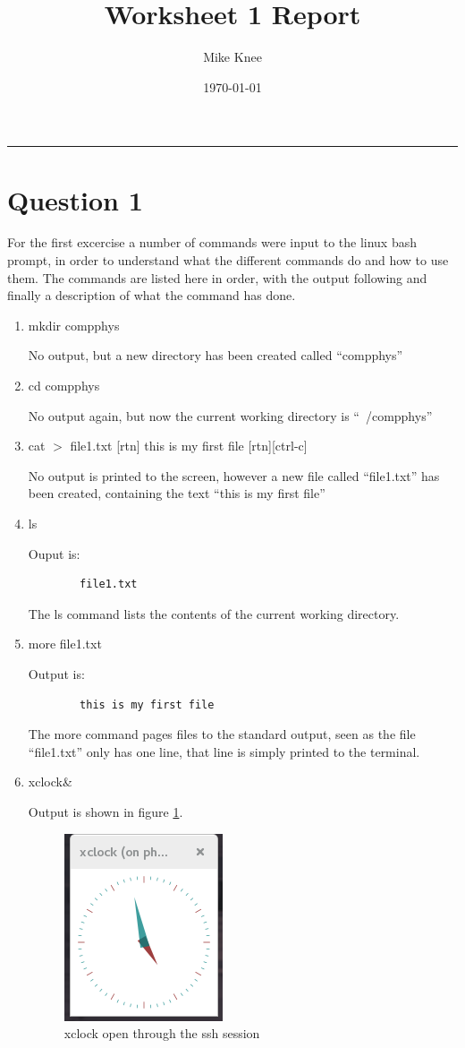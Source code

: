 \documentclass[a4paper,12pt]{UoBnote}
\author{Mike Knee}
\title{Worksheet 1 Report}
\date{\today}
\begin{document}
\maketitle
\tableofcontents
\vspace{1cm}\hrule \vspace{1cm}

\section{Question 1}

For the first excercise a number of commands were input to the linux bash prompt, in order to understand what the different commands do and how to use them. The commands are listed here in order, with the output following and finally a description of what the command has done.
\begin{enumerate}[label=\alph*)]
	\item mkdir compphys

		No output, but a new directory has been created called ``compphys''
	\item cd compphys

		No output again, but now the current working directory is ``~/compphys''
	\item cat $>$ file1.txt [rtn] this is my first file [rtn][ctrl-c]

		No output is printed to the screen, however a new file called ``file1.txt'' has been created, containing the text ``this is my first file''
	\item ls

		Ouput is: 
		\begin{verbatim}
		file1.txt
		\end{verbatim}

		The ls command lists the contents of the current working directory.
	\item more file1.txt

		Output is:
		\begin{verbatim}
		this is my first file
		\end{verbatim}

		The more command pages files to the standard output, seen as the file ``file1.txt'' only has one line, that line is simply printed to the terminal.
	\item xclock\&

		Output is shown in figure \ref{fig:xclock}.
		\begin{figure}
			\centering
			\includegraphics{xclock}
			\caption{xclock open through the ssh session}
			\label{fig:xclock}
		\end{figure}


\end{enumerate}
\end{document}
